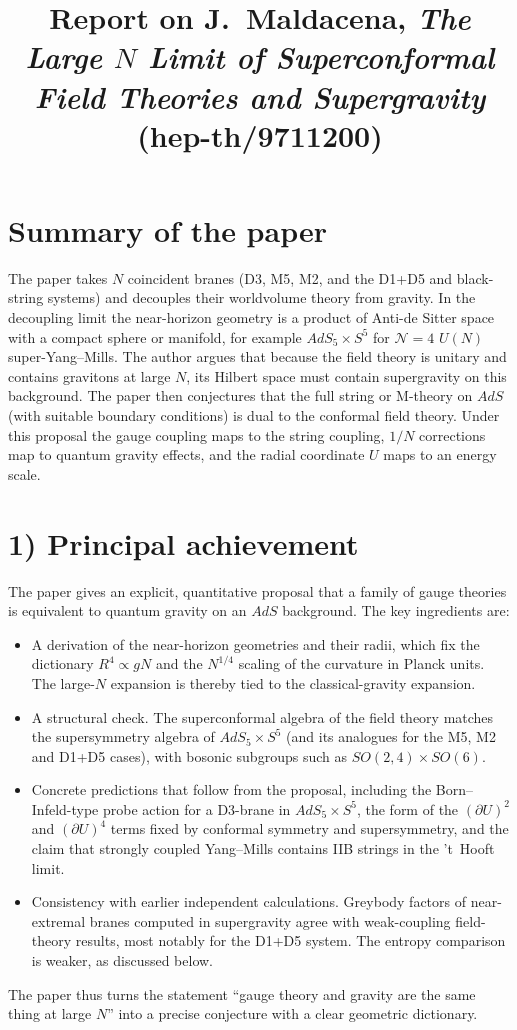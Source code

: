 \documentclass[11pt]{article}
\title{Report on J.~Maldacena, \emph{The Large $N$ Limit of Superconformal Field Theories and Supergravity} (hep-th/9711200)}
\author{}
\date{}
\begin{document}
\maketitle

\section*{Summary of the paper}

The paper takes $N$ coincident branes (D3, M5, M2, and the D1+D5 and black-string systems) and decouples their worldvolume theory from gravity. In the decoupling limit the near-horizon geometry is a product of Anti-de Sitter space with a compact sphere or manifold, for example $AdS_5\times S^5$ for $\mathcal N=4$ $U(N)$ super-Yang--Mills. The author argues that because the field theory is unitary and contains gravitons at large $N$, its Hilbert space must contain supergravity on this background. The paper then conjectures that the full string or M-theory on $AdS$ (with suitable boundary conditions) is dual to the conformal field theory. Under this proposal the gauge coupling maps to the string coupling, $1/N$ corrections map to quantum gravity effects, and the radial coordinate $U$ maps to an energy scale.

\section*{1) Principal achievement}

The paper gives an explicit, quantitative proposal that a family of gauge theories is equivalent to quantum gravity on an $AdS$ background. The key ingredients are:
\begin{itemize}
  \item A derivation of the near-horizon geometries and their radii, which fix the dictionary $R^4 \propto gN$ and the $N^{1/4}$ scaling of the curvature in Planck units. The large-$N$ expansion is thereby tied to the classical-gravity expansion.
  \item A structural check. The superconformal algebra of the field theory matches the supersymmetry algebra of $AdS_5\times S^5$ (and its analogues for the M5, M2 and D1+D5 cases), with bosonic subgroups such as $SO(2,4)\times SO(6)$.
  \item Concrete predictions that follow from the proposal, including the Born--Infeld-type probe action for a D3-brane in $AdS_5\times S^5$, the form of the $(\partial U)^2$ and $(\partial U)^4$ terms fixed by conformal symmetry and supersymmetry, and the claim that strongly coupled Yang--Mills contains IIB strings in the 't~Hooft limit.
  \item Consistency with earlier independent calculations. Greybody factors of near-extremal branes computed in supergravity agree with weak-coupling field-theory results, most notably for the D1+D5 system. The entropy comparison is weaker, as discussed below.
\end{itemize}
The paper thus turns the statement ``gauge theory and gravity are the same thing at large $N$'' into a precise conjecture with a clear geometric dictionary.
\end{document}
